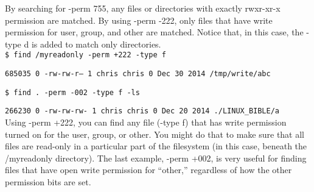 \documentclass[a4paper,11pt,spanish]{article} %
\begin{document}
By searching for -perm 755, any files or directories with exactly rwxr-xr-x
permission are matched. By using -perm -222, only files that have write permission for
user, group, and other are matched. Notice that, in this case, the -type d is added to
match only directories.\\

\texttt{\$ find /myreadonly -perm +222 -type f}

\texttt{685035 0 -rw-rw-r-- 1 chris chris 0 Dec 30 2014 /tmp/write/abc}

\texttt{\$ find . -perm -002 -type f -ls}

\texttt{266230 0 -rw-rw-rw- 1 chris chris 0 Dec 20 2014 ./LINUX\_BIBLE/a}\\

Using -perm +222, you can find any file (-type f) that has write permission turned on
for the user, group, or other. You might do that to make sure that all files are read-only in
a particular part of the filesystem (in this case, beneath the /myreadonly directory). The
last example, -perm +002, is very useful for finding files that have open write permission
for “other,” regardless of how the other permission bits are set.

\cite{linuxbible}
\end{document}
